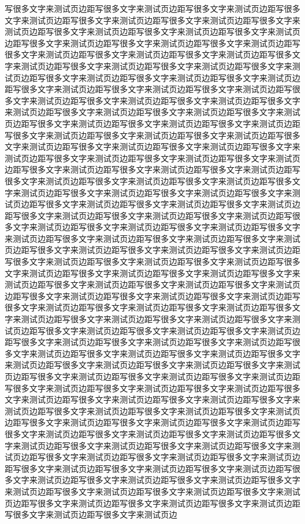 写很多文字来测试页边距写很多文字来测试页边距写很多文字来测试页边距写很多文字来测试页边距写很多文字来测试页边距写很多文字来测试页边距写很多文字来测试页边距写很多文字来测试页边距写很多文字来测试页边距写很多文字来测试页边距写很多文字来测试页边距写很多文字来测试页边距写很多文字来测试页边距写很多文字来测试页边距写很多文字来测试页边距写很多文字来测试页边距写很多文字来测试页边距写很多文字来测试页边距写很多文字来测试页边距写很多文字来测试页边距写很多文字来测试页边距写很多文字来测试页边距写很多文字来测试页边距写很多文字来测试页边距写很多文字来测试页边距写很多文字来测试页边距写很多文字来测试页边距写很多文字来测试页边距写很多文字来测试页边距写很多文字来测试页边距写很多文字来测试页边距写很多文字来测试页边距写很多文字来测试页边距写很多文字来测试页边距写很多文字来测试页边距写很多文字来测试页边距写很多文字来测试页边距写很多文字来测试页边距写很多文字来测试页边距写很多文字来测试页边距写很多文字来测试页边距写很多文字来测试页边距写很多文字来测试页边距写很多文字来测试页边距写很多文字来测试页边距写很多文字来测试页边距写很多文字来测试页边距写很多文字来测试页边距写很多文字来测试页边距写很多文字来测试页边距写很多文字来测试页边距写很多文字来测试页边距写很多文字来测试页边距写很多文字来测试页边距写很多文字来测试页边距写很多文字来测试页边距写很多文字来测试页边距写很多文字来测试页边距写很多文字来测试页边距写很多文字来测试页边距写很多文字来测试页边距写很多文字来测试页边距写很多文字来测试页边距写很多文字来测试页边距写很多文字来测试页边距写很多文字来测试页边距写很多文字来测试页边距写很多文字来测试页边距写很多文字来测试页边距写很多文字来测试页边距写很多文字来测试页边距写很多文字来测试页边距写很多文字来测试页边距写很多文字来测试页边距写很多文字来测试页边距写很多文字来测试页边距写很多文字来测试页边距写很多文字来测试页边距写很多文字来测试页边距写很多文字来测试页边距写很多文字来测试页边距写很多文字来测试页边距写很多文字来测试页边距写很多文字来测试页边距写很多文字来测试页边距写很多文字来测试页边距写很多文字来测试页边距写很多文字来测试页边距写很多文字来测试页边距写很多文字来测试页边距写很多文字来测试页边距写很多文字来测试页边距写很多文字来测试页边距写很多文字来测试页边距写很多文字来测试页边距写很多文字来测试页边距写很多文字来测试页边距写很多文字来测试页边距写很多文字来测试页边距写很多文字来测试页边距写很多文字来测试页边距写很多文字来测试页边距写很多文字来测试页边距写很多文字来测试页边距写很多文字来测试页边距写很多文字来测试页边距写很多文字来测试页边距写很多文字来测试页边距写很多文字来测试页边距写很多文字来测试页边距写很多文字来测试页边距写很多文字来测试页边距写很多文字来测试页边距写很多文字来测试页边距写很多文字来测试页边距写很多文字来测试页边距写很多文字来测试页边距写很多文字来测试页边距写很多文字来测试页边距写很多文字来测试页边距写很多文字来测试页边距写很多文字来测试页边距写很多文字来测试页边距写很多文字来测试页边距写很多文字来测试页边距写很多文字来测试页边距写很多文字来测试页边距写很多文字来测试页边距写很多文字来测试页边距写很多文字来测试页边距写很多文字来测试页边距写很多文字来测试页边距写很多文字来测试页边距写很多文字来测试页边距写很多文字来测试页边距写很多文字来测试页边距写很多文字来测试页边距写很多文字来测试页边距写很多文字来测试页边距写很多文字来测试页边距写很多文字来测试页边距写很多文字来测试页边距写很多文字来测试页边距写很多文字来测试页边距写很多文字来测试页边距写很多文字来测试页边
